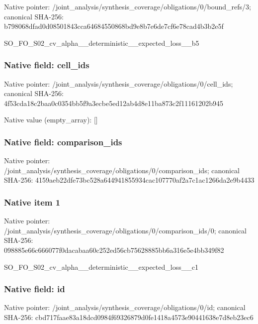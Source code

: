 \documentclass[10pt,a4paper]{article}
\begin{document}
Native pointer: /joint\_analysis/synthesi\allowbreak{}s\_coverage/obligations/0\allowbreak{}/bound\_refs/3; canonical SHA-256: b798068dfad0d08501843cca\allowbreak{}64684550868bd9e8b7e6de7c\allowbreak{}f6e78cad4b3b2e5f


SO\_FO\_S02\_cv\_alpha\_\_dete\allowbreak{}rministic\_\_expected\_loss\allowbreak{}\_\_b5


\subsubsection{Native field: cell\_ids}


Native pointer: /joint\_analysis/synthesi\allowbreak{}s\_coverage/obligations/0\allowbreak{}/cell\_ids; canonical SHA-256: 4f53cda18c2baa0c0354bb5f\allowbreak{}9a3ecbe5ed12ab4d8e11ba87\allowbreak{}3c2f11161202b945



Native value (empty\_array): []



\subsubsection{Native field: comparison\_ids}


Native pointer: /joint\_analysis/synthesi\allowbreak{}s\_coverage/obligations/0\allowbreak{}/comparison\_ids; canonical SHA-256: 4159aeb22dfe73bc528a6449\allowbreak{}41855934cac107770af2a7c1\allowbreak{}ac1266da2e9b4433



\subsubsection{Native item 1}


Native pointer: /joint\_analysis/synthesi\allowbreak{}s\_coverage/obligations/0\allowbreak{}/comparison\_ids/0; canonical SHA-256: 098885e66c666077f0dacaba\allowbreak{}a60c252ed56cb75628885bb6\allowbreak{}a316e5e4bb349f82


SO\_FO\_S02\_cv\_alpha\_\_dete\allowbreak{}rministic\_\_expected\_loss\allowbreak{}\_\_c1


\subsubsection{Native field: id}


Native pointer: /joint\_analysis/synthesi\allowbreak{}s\_coverage/obligations/0\allowbreak{}/id; canonical SHA-256: cbd717faae83a18dcd0984f6\allowbreak{}9326879d0fe1418a4573e904\allowbreak{}41638e7d8eb23ec6
\end{document}
